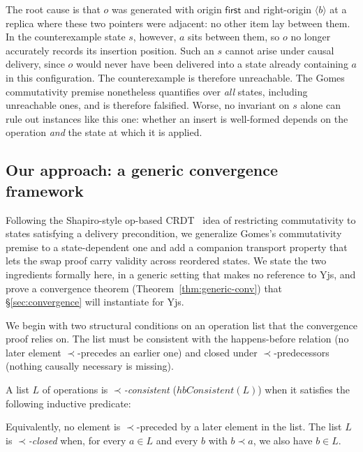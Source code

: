 \documentclass[sigplan,screen]{acmart}
\newcommand{\hb}{\mathrel{\prec}}
\newcommand{\hble}{\mathrel{\preceq}}
\newcommand{\First}{\mathsf{first}}
\begin{document}
The root cause is that $o$ was generated with origin $\First$ and
right-origin $\langle b \rangle$ at a replica where these two pointers
were adjacent: no other item lay between them.  In the counterexample
state $s$, however, $a$ sits between them, so $o$ no longer accurately
records its insertion position.  Such an $s$ cannot arise under causal
delivery, since $o$ would never have been delivered into a state already
containing $a$ in this configuration.  The counterexample is therefore unreachable.
The Gomes commutativity premise nonetheless quantifies over \emph{all}
states, including unreachable ones, and is therefore falsified.  Worse,
no invariant on $s$ alone can rule out instances like this one: whether
an insert is well-formed depends on the operation \emph{and} the state
at which it is applied.

\subsection{Our approach: a generic convergence framework}
\label{subsec:our-approach}

Following the Shapiro-style op-based CRDT~\cite{Shapiro2011} idea of restricting
commutativity to states satisfying a delivery precondition, we generalize
Gomes's commutativity premise to a state-dependent one and add a
companion transport property that lets the swap proof carry validity
across reordered states.  We state the two ingredients formally here, in
a generic setting that makes no reference to Yjs, and prove a
convergence theorem (Theorem~\ref{thm:generic-conv}) that
\S\ref{sec:convergence} will instantiate for Yjs.

We begin with two structural conditions on an operation list that the
convergence proof relies on.  The list must be consistent with the
happens-before relation (no later element $\hb$-precedes an earlier
one) and closed under $\hb$-predecessors (nothing causally necessary
is missing).

\begin{definition}[$\hb$-consistency and $\hb$-closure]
\label{def:hb-consistent}
A list $L$ of operations is \emph{$\hb$-consistent}
($\mathit{hbConsistent}(L)$) when it satisfies the following inductive
predicate:
Equivalently, no element is $\hb$-preceded by a later element in the
list.  The list $L$ is \emph{$\hb$-closed} when, for every $a \in L$
and every $b$ with $b \hb a$, we also have $b \in L$.
\end{definition}
\end{document}
